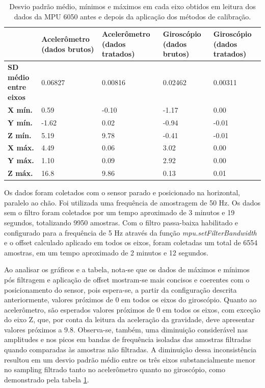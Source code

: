 \begin{table}[htbp]
\centering
\caption{Desvio padrão médio, mínimos e máximos em cada eixo obtidos em leitura dos dados da MPU 6050 antes e depois da aplicação dos métodos de calibração.}
\label{tab:calibracao_mpu}
\renewcommand{\arraystretch}{1.5} 
\begin{tabular}{|p{2.5cm}|p{2.8cm}|p{2.8cm}|p{2.8cm}|p{2.8cm}|}
\hline
 & \textbf{Acelerômetro (dados brutos)} & \textbf{Acelerômetro (dados tratados)} & \textbf{Giroscópio (dados brutos)} & \textbf{Giroscópio (dados tratados)} \\ \hline
\textbf{SD médio entre eixos} & 0.06827 & 0.00816 & 0.02462 & 0.00311 \\ \hline
\textbf{X mín.} & 0.59 & -0.10 & -1.17 & 0.00 \\ \hline
\textbf{Y mín.} & -1.62 & 0.02 & -0.94 & -0.01 \\ \hline
\textbf{Z mín.} & 5.19 & 9.78 & -0.41 & -0.01 \\ \hline
\textbf{X máx.} & 4.49 & 0.06 & 3.02 & 0.00 \\ \hline
\textbf{Y máx.} & 1.10 & 0.09 & 2.92 & 0.00 \\ \hline
\textbf{Z máx.} & 16.8 & 9.86 & 0.13 & 0.01 \\ \hline
\end{tabular}
\end{table}

Os dados foram coletados com o sensor parado e posicionado na horizontal, paralelo ao chão. Foi utilizada uma frequência de amostragem de 50 Hz. Os dados sem o filtro foram coletados por um tempo aproximado de 3 minutos e 19 segundos, totalizando 9950 amostras. Com o filtro passa-baixa habilitado e configurado para a frequência de 5 Hz através da função \emph{mpu.setFilterBandwidth} e o offset calculado aplicado em todos os eixos, foram coletadas um total de 6554 amostras, em um tempo aproximado de 2 minutos e 12 segundos. 

Ao analisar os gráficos e a tabela, nota-se que os dados de máximos e mínimos pós filtragem e aplicação de offset mostram-se mais concisos e coerentes com o posicionamento do sensor, pois espera-se, a partir da configuração descrita anteriormente, valores próximos de 0 em todos os eixos do giroscópio. Quanto ao acelerômetro, são esperados valores próximos de 0 em todos os eixos, com exceção do eixo Z, que, por conta da leitura da aceleração da gravidade, deve apresentar valores próximos a 9.8. Observa-se, também, uma diminuição considerável nas amplitudes e nos picos em bandas de frequência isoladas das amostras filtradas quando comparadas às amostras não filtradas. A diminuição dessa inconsistência resultou em um desvio padrão médio entre os três eixos substancialmente menor no sampling filtrado tanto no acelerômetro quanto no giroscópio, como demonstrado pela tabela \ref{tab:calibracao_mpu}. 

